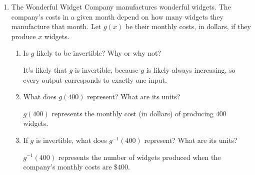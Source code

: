 \documentclass{article}
\begin{document}
\begin{enumerate}
\begin{solution}
    To find a formula for the inverse function, we solve $g(y)=x$ for $y$.
    \begin{align*}
      -\frac{5}{y-2}+3 &= x \\
      \frac{5}{y-2} &= 3-x\\
      \frac{5}{3-x} &= y-2 \\
      \frac{5}{3-x} +2 &= y
    \end{align*}
    Thus, $g^{-1}(x) = \dfrac{5}{3-x}+2$.
  \end{solution}

\item  The Wonderful Widget Company manufactures wonderful widgets. The company's costs in a given month depend on how many widgets they manufacture that month. Let $g(x)$ be their monthly costs, in dollars, if they produce $x$ widgets.

  \begin{enumerate}
  \item
    \begin{problem}[\vfill]
      Is $g$ likely to be invertible?  Why or why not? 
    \end{problem}

    \begin{solution}
      It's likely that $g$ is invertible, because $g$ is likely always
      increasing, so every output corresponds to exactly one input.
    \end{solution}

  \item
    \begin{problem}[\vfill]
      What does $g(400)$ represent?  What are its units?
    \end{problem}

    \begin{solution}
      $g(400)$ represents the monthly cost (in dollars) of producing $400$ widgets.
    \end{solution}

  \item
    \begin{problem}[\vfill]
      If $g$ is invertible, what does $g^{-1}(400)$ represent? What are its units?
    \end{problem}

    \begin{solution}
      $g^{-1}(400)$ represents the number of widgets produced when the company's monthly
      costs are $\$400$.
    \end{solution}


\end{enumerate}
\end{enumerate}
\end{document}
